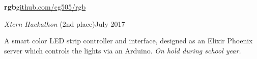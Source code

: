 \documentclass[11pt]{article}
\begin{document}
\begin{minipage}[t]{0.67\textwidth}
  \textbf{rgb}\hfill\href{https://github.com/cg505/rgb/}{github.com/cg505/rgb}
  \begin{adjustwidth}{10pt}{}
    \emph{Xtern Hackathon} (2nd place)\hfill July 2017

    A smart color LED strip controller and interface, designed as an Elixir Phoenix server which controls the lights via an Arduino.
    \emph{On hold during school year.}
  \end{adjustwidth}

\end{minipage}
\end{document}
